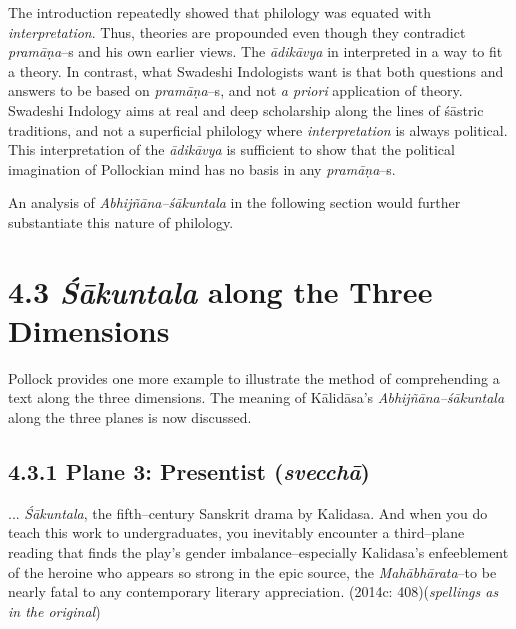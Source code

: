 The introduction repeatedly showed that philology was equated with \textit{interpretation}. Thus, theories are propounded even though they contradict\textit{ pramāṇa}–s and his own earlier views. The\textit{ ādikāvya} in interpreted in a way to fit a theory. In contrast, what Swadeshi Indologists want is that both questions and answers to be based on \textit{pramāṇa}–s, and not \textit{a priori} application of theory. Swadeshi Indology aims at real and deep scholarship along the lines of śāstric traditions, and not a superficial philology where \textit{interpretation} is always political. This interpretation of the \textit{ādikāvya }is sufficient to show that the political imagination of Pollockian mind has no basis in any \textit{pramāṇa}–s.

An analysis of \textit{Abhijñāna–śākuntala} in the following section would further substantiate this nature of philology.


\section*{4.3 {\it {\bfseries Śākuntala}} along the Three Dimensions}

Pollock provides one more example to illustrate the method of comprehending a text along the three dimensions. The meaning of Kālidāsa’s \textit{Abhijñāna–śākuntala }along the three planes is now discussed.

\subsection*{4.3.1 Plane 3: Presentist ({\it {\bfseries svecchā}})}

\begin{myquote}
... \textit{Śākuntala}, the fifth–century Sanskrit drama by Kalidasa. And when you do teach this work to undergraduates, you inevitably encounter a third–plane reading that finds the play’s gender imbalance–especially Kalidasa’s enfeeblement of the heroine who appears so strong in the epic source, the \textit{Mahābhārata}–to be nearly fatal to any contemporary literary appreciation. (2014c: 408)(\textit{spellings as in the original})
\end{myquote}

